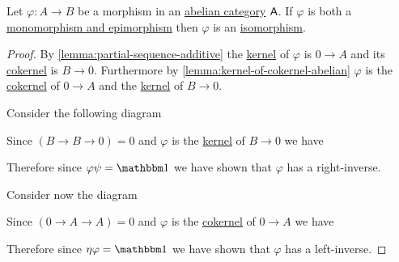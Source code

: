 \documentclass[../../../main]{subfiles}
\begin{document}
\begin{lemma}
  Let \(\varphi: A \to B\) be a morphism in an \hyperref[def:abelian-category]{abelian category} \(\mathsf{A}\).
  If \(\varphi\) is both a \hyperref[def:mono-epi-morphism]{monomorphism and epimorphism} then \(\varphi\) is an \hyperref[def:categorical-isomorphism]{isomorphism}.
\end{lemma}
\begin{proof}
  By \autoref{lemma:partial-sequence-additive} the \hyperref[def:categorical-kernel]{kernel} of \(\varphi\) is \(0 \to A\) and its \hyperref[def:categorical-cokernel]{cokernel} is \(B \to 0\).
  Furthermore by \autoref{lemma:kernel-of-cokernel-abelian} \(\varphi\) is the \hyperref[def:categorical-cokernel]{cokernel} of \(0 \to A\) and the \hyperref[def:categorical-kernel]{kernel} of \(B \to 0\).

  Consider the following diagram
  \begin{center}
  \end{center}
  Since \((B \to B \to 0) = 0\) and \(\varphi\) is the \hyperref[def:categorical-kernel]{kernel} of \(B \to 0\) we have
  \begin{center}
  \end{center}
  Therefore since \(\varphi \psi = \id\) we have shown that \(\varphi\) has a right-inverse.

  Consider now the diagram
  \begin{center}
  \end{center}
  Since \((0 \to A \to A) = 0\) and \(\varphi\) is the \hyperref[def:categorical-cokernel]{cokernel} of \(0 \to A\) we have
  \begin{center}
  \end{center}
  Therefore since \(\eta \varphi = \id\) we have shown that \(\varphi\) has a left-inverse.
\end{proof}
\end{document}
